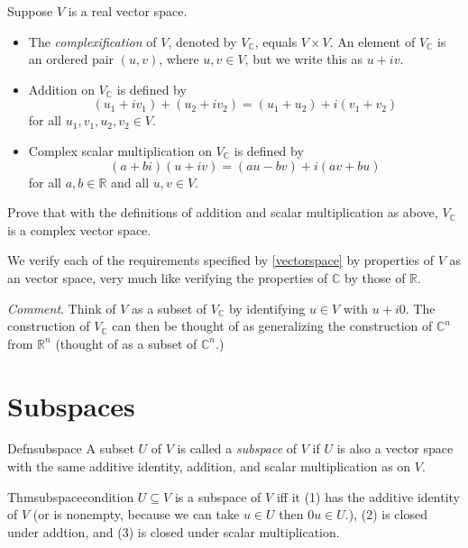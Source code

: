 \begin{exercise}
  Suppose $V$ is a real vector space.

  \begin{itemize}
    \item The \emph{complexification} of $V$, denoted by $V_{\mathbb{C}}$, equals $V \times V$. An element of $V_{\mathbb{C}}$ is an ordered pair $(u, v)$, where $u, v \in V$, but we write this as $u + iv$.

    \item Addition on $V_{\mathbb{C}}$ is defined by
          \[
            (u_1 + iv_1) + (u_2 + iv_2) = (u_1 + u_2) + i(v_1 + v_2)
          \]
          for all $u_1, v_1, u_2, v_2 \in V$.

    \item Complex scalar multiplication on $V_{\mathbb{C}}$ is defined by
          \[
            (a + bi)(u + iv) = (au - bv) + i(av + bu)
          \]
          for all $a, b \in \mathbb{R}$ and all $u, v \in V$.
  \end{itemize}

  Prove that with the definitions of addition and scalar multiplication as above, $V_{\mathbb{C}}$ is a complex vector space.
\end{exercise}

We verify each of the requirements specified by \ref{vectorspace} by properties of $V$ as an vector space, very much like verifying the properties of $\mathbb C$ by those of $\mathbb R$.

\textit{Comment}. Think of $V$ as a subset of $V_{\mathbb C}$ by identifying $u\in V$ with $u+i0$. The construction of $V_{\mathbb C}$ can then be thought of as generalizing the construction of $\mathbb C^n$ from $\mathbb R^n$ (thought of as a subset of $\mathbb C^n$.)

\section{Subspaces}

\begin{reference}{Defn}{subspace}
  A subset $U$ of $V$ is called a \textit{subspace} of $V$ if $U$ is also a vector space with the same additive identity, addition, and scalar multiplication as on $V$.
\end{reference}

\begin{reference}{Thm}{subspacecondition}
  $U\subseteq V$ is a subspace of $V$ iff it (1) has the additive identity of $V$ (or is nonempty, because we can take $u\in U$ then $0u\in U$.), (2) is closed under addtion, and (3) is closed under scalar multiplication.
\end{reference}

